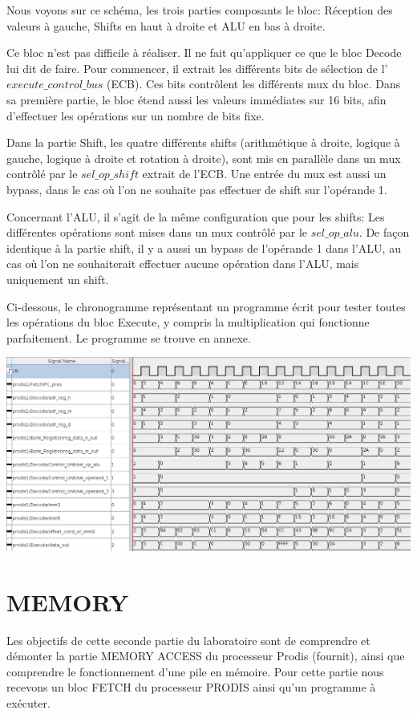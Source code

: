 \documentclass[11pt,a4paper]{article}
\begin{document}
Nous voyons sur ce schéma, les trois parties composants le bloc: Réception des valeurs à gauche, Shifts en haut à droite et ALU en bas à droite.

Ce bloc n'est pas difficile à réaliser. Il ne fait qu'appliquer ce que le bloc Decode lui dit de faire. Pour commencer, il extrait les différents bits de sélection de l'$execute\_control\_bus$ (ECB). Ces bits contrôlent les différents mux du bloc. Dans sa première partie, le bloc étend aussi les valeurs immédiates sur 16 bits, afin d'effectuer les opérations sur un nombre de bits fixe.

Dans la partie Shift, les quatre différents shifts (arithmétique à droite, logique à gauche, logique à droite et rotation à droite), sont mis en parallèle dans un mux contrôlé par le $sel\_op\_shift$ extrait de l'ECB. Une entrée du mux est aussi un bypass, dans le cas où l'on ne souhaite pas effectuer de shift sur l'opérande 1.

Concernant l'ALU, il s'agit de la même configuration que pour les shifts: Les différentes opérations sont mises dans un mux contrôlé par le $sel\_op\_alu$. De façon identique à la partie shift, il y a aussi un bypass de l'opérande 1 dans l'ALU, au cas où l'on ne souhaiterait effectuer aucune opération dans l'ALU, mais uniquement un shift.

Ci-dessous, le chronogramme représentant un programme écrit pour tester toutes les opérations du bloc Execute, y compris la multiplication qui fonctionne parfaitement. Le programme se trouve en annexe.

\includegraphics[width=15.8cm]{img_chrono2.png}

\section{MEMORY}

Les objectifs de cette seconde partie du laboratoire sont de comprendre et démonter la partie MEMORY ACCESS du processeur Prodis (fournit), ainsi que comprendre le fonctionnement d'une pile en mémoire. Pour cette partie nous recevons un bloc FETCH du processeur PRODIS ainsi qu'un programme à exécuter.
\end{document}
